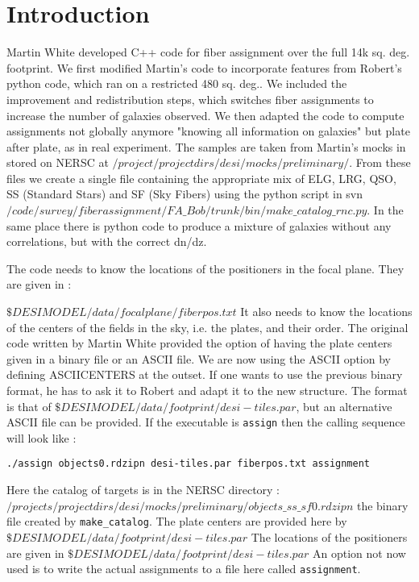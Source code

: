 \documentclass[10pt]{extarticle}
\begin{document}
\section{Introduction}
\begin{multicols}{2}
Martin White developed C++ code for fiber assignment over the full 14k sq. deg. footprint.  We first modified Martin's code to incorporate features from Robert's python code, which ran on a restricted 480 sq. deg.. We included the improvement and redistribution steps, which switches fiber assignments to increase the number of galaxies observed. We then adapted the code to compute assignments not globally anymore "knowing all information on galaxies" but plate after plate, as in real experiment.
The samples are taken from Martin's mocks in stored on NERSC at $/project/projectdirs/desi/mocks/preliminary/$.  From these files we create a single file containing the appropriate mix of ELG, LRG, QSO, SS (Standard Stars) and SF (Sky Fibers) using the python script in svn $/code/survey/fiberassignment/FA\_Bob/trunk/bin/make\_catalog\_rnc.py$.  In the same place there is python code to produce a mixture of galaxies without any correlations, but with the correct dn/dz.  
  
  The code needs to know the locations of the positioners in the focal plane.  They are given in :
  
  $ \$DESIMODEL/data/focalplane/fiberpos.txt$
  It also needs to know the locations of the centers of the fields in the sky, i.e. the plates, and their order.  The original code written by Martin White provided the option of having the plate centers given in a binary file or an ASCII file.  We are now using the ASCII option by defining ASCIICENTERS at the outset.  If one wants to use the previous binary format, he has to ask it to Robert and adapt it to the new structure. The format is that of $\$DESIMODEL/data/footprint/desi-tiles.par$, but an alternative ASCII file can be provided. If the executable is {\tt assign} then the calling sequence will look like :
  
  {\tt./assign objects0.rdzipn desi-tiles.par fiberpos.txt assignment}
 
 Here the catalog of targets is in the NERSC directory :
  $/projects/projectdirs/desi/mocks/preliminary/objects\_ss\_sf0.rdzipn$ the binary file created by {\tt make\_catalog}.  The plate centers are provided here by  $\$DESIMODEL/data/footprint/desi-tiles.par$    The locations of the positioners are given in $ \$DESIMODEL/data/footprint/desi-tiles.par$  An option not now used is to write the actual assignments to a file here called {\tt assignment}.
  

\end{multicols}
\end{document}

